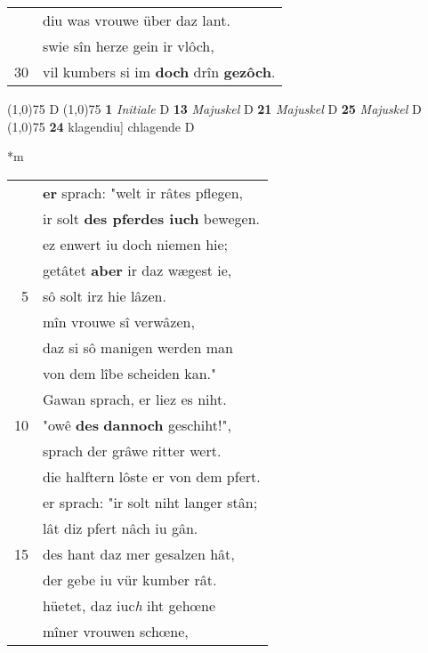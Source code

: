 \documentclass[8pt,a4paper,notitlepage]{article}
\begin{document}
\begin{table}[ht]
\begin{minipage}[t]{0.5\linewidth}
\begin{tabular}{rl}
 & diu was vrouwe über daz lant.\\ 
 & swie sîn herze gein ir vlôch,\\ 
30 & vil kumbers si im \textbf{doch} drîn \textbf{gezôch}.\\ 
\end{tabular}
\scriptsize
\line(1,0){75} \newline
D \newline
\line(1,0){75} \newline
\textbf{1} \textit{Initiale} D  \textbf{13} \textit{Majuskel} D  \textbf{21} \textit{Majuskel} D  \textbf{25} \textit{Majuskel} D  \newline
\line(1,0){75} \newline
\textbf{24} klagendiu] chlagende D \newline
\end{minipage}
\hspace{0.5cm}
\begin{minipage}[t]{0.5\linewidth}
\small
\begin{center}*m
\end{center}
\begin{tabular}{rl}
 & \textbf{er} sprach: "welt ir râtes pflegen,\\ 
 & ir solt \textbf{des pferdes iuch} bewegen.\\ 
 & ez enwert iu doch niemen hie;\\ 
 & getâtet \textbf{aber} ir daz wægest ie,\\ 
5 & sô solt irz hie lâzen.\\ 
 & mîn vrouwe sî verwâzen,\\ 
 & daz si sô manigen werden man\\ 
 & von dem lîbe scheiden kan."\\ 
 & Gawan sprach, er liez es niht.\\ 
10 & "owê \textbf{des} \textbf{dannoch} geschiht!",\\ 
 & sprach der grâwe ritter wert.\\ 
 & die halftern lôste er von dem pfert.\\ 
 & er sprach: "ir solt niht langer stân;\\ 
 & lât diz pfert nâch iu gân.\\ 
15 & des hant daz mer gesalzen hât,\\ 
 & der gebe iu vür kumber rât.\\ 
 & hüetet, daz iuc\textit{h} iht gehœne\\ 
 & mîner vrouwen schœne,\\ 

\end{tabular}
\end{minipage}
\end{table}
\end{document}
